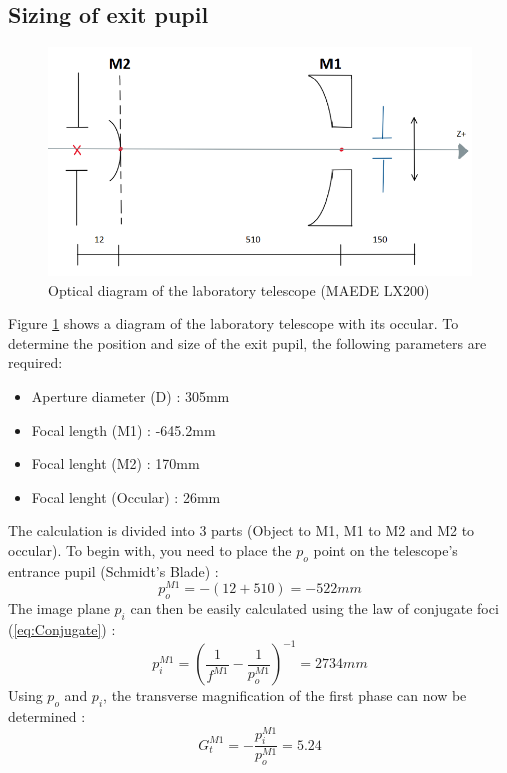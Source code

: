 \subsection{Sizing of exit pupil}
\begin{figure}[H]
    \centering
    \includegraphics[scale=0.9]{assets/figures/Optical Design/Design_Mask.png}
    \caption{Optical diagram of the laboratory telescope (MAEDE LX200)}
    \label{fig:Opti_Mask_Diagram}
\end{figure}
Figure \ref{fig:Opti_Mask_Diagram} shows a diagram of the laboratory telescope with its occular.
To determine the position and size of the exit pupil, the following parameters are required:
\begin{itemize}
    \item Aperture diameter (D) : 305mm
    \item Focal length (M1) : -645.2mm
    \item Focal lenght (M2) : 170mm
    \item Focal lenght (Occular) : 26mm
\end{itemize}
The calculation is divided into 3 parts (Object to M1, M1 to M2 and M2 to occular).
To begin with, you need to place the $p_o$ point on the telescope's entrance pupil (Schmidt's Blade) :
\begin{equation}
    p_o^{M1} = -(12+510) = -522mm
\end{equation}
The image plane $p_i$ can then be easily calculated using the law of conjugate foci (\ref{eq:Conjugate}) :
\begin{equation}
    p_i^{M1} = \left(\frac{1}{f^{M1}}-\frac{1}{p_o^{M1}}\right)^{-1} = 2734 mm
\end{equation}
Using $p_o$ and $p_i$, the transverse magnification of the first phase can now be determined :
\begin{equation}
    G_t^{M1} = -\frac{p_i^{M1}}{p_o^{M1}} = 5.24
\end{equation}
